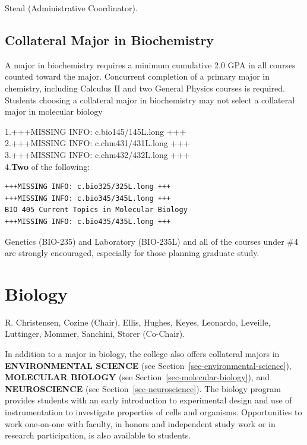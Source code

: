 \documentclass[
  letterpaper,
]{scrbook}
\begin{document}
Stead (Administrative Coordinator).

\subsection{Collateral Major in
Biochemistry}\label{collateral-major-in-biochemistry}

A major in biochemistry requires a minimum cumulative 2.0 GPA in all
courses counted toward the major. Concurrent completion of a primary
major in chemistry, including Calculus II and two General Physics
courses is required. Students choosing a collateral major in
biochemistry may not select a collateral major in molecular biology

1.+++MISSING INFO: c.bio145/145L.long +++\\
2.+++MISSING INFO: c.chm431/431L.long +++\\
3.+++MISSING INFO: c.chm432/432L.long +++\\
4.\textbf{Two} of the following:

\begin{verbatim}
+++MISSING INFO: c.bio325/325L.long +++  
+++MISSING INFO: c.bio345/345L.long +++  
BIO 405 Current Topics in Molecular Biology  
+++MISSING INFO: c.bio435/435L.long +++  
\end{verbatim}

Genetics (BIO-235) and Laboratory (BIO-235L) and all of the courses
under \#4 are strongly encouraged, especially for those planning
graduate study.

\section{Biology}\label{sec-biology}

R. Christensen, Cozine (Chair), Ellis, Hughes, Keyes, Leonardo,
Leveille, Luttinger, Mommer, Sanchini, Storer (Co-Chair).

In addition to a major in biology, the college also offers collateral
majors in \textbf{ENVIRONMENTAL SCIENCE} (see
Section~\ref{sec-environmental-science}), \textbf{MOLECULAR BIOLOGY}
(see Section~\ref{sec-molecular-biology}), and \textbf{NEUROSCIENCE}
(see Section~\ref{sec-neuroscience}). The biology program provides
students with an early introduction to experimental design and use of
instrumentation to investigate properties of cells and organisms.
Opportunities to work one-on-one with faculty, in honors and independent
study work or in research participation, is also available to students.
\end{document}

